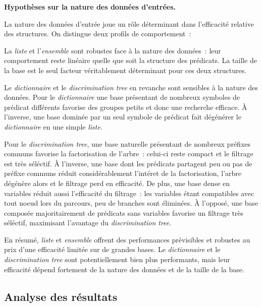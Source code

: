 \documentclass[11pt]{article}
\newenvironment{paraph}[1]{%
  \medskip
  \noindent\textbf{#1.}\quad

  \vspace{0.2cm}
}{%
  \medskip
}
\begin{document}
\begin{paraph}{Hypothèses sur la nature des données d'entrées}
    La nature des données d'entrée joue un rôle déterminant dans l'efficacité relative
    des structures. On distingue deux profils de comportement~:

    \vspace{0.2cm}
    La \textit{liste} et l'\textit{ensemble} sont robustes face à la nature des données~: 
    leur comportement reste linéaire quelle que soit la structure des prédicats. La taille de la base est le seul
    facteur véritablement déterminant pour ces deux structures.

    \vspace{0.2cm}
    Le \textit{dictionnaire} et le \textit{discrimination tree} en revanche sont sensibles à la nature
    des données. Pour le \textit{dictionnaire} une base présentant de nombreux symboles de prédicat
    différents favorise des groupes petits et donc une recherche efficace. À l'inverse, une base dominée
    par un seul symbole de prédicat fait dégénérer le \textit{dictionnaire} en une simple \textit{liste}.

    \vspace{0.2cm}
    Pour le \textit{discrimination tree}, une base naturelle présentant de nombreux préfixes communs
    favorise la factorisation de l'arbre~: celui-ci reste compact et le filtrage est très séléctif.
    À l'inverse, une base dont les prédicats partagent peu ou pas de préfixe communs réduit considérablement
    l'intéret de la factorisation, l'arbre dégénère alors et le filtrage perd en efficacité. De plus,
    une base dense en variables réduit aussi l'efficacité du filtrage~: les variables
    étant compatibles avec tout noeud lors du parcours, peu de branches sont éliminées.
    À l'opposé, une base composée majoritairement de prédicats sans variables favorise un filtrage très séléctif, 
    maximisant l'avantage du \textit{discrimination tree}.

   \vspace{0.2cm}
   En résumé, \textit{liste} et \textit{ensemble} offrent des performances prévisibles et robustes au prix
   d'une efficacité limitée sur de grandes bases. Le \textit{dictionnaire} et le \textit{discrimination tree} sont
   potentiellement bien plus performants, mais leur efficacité dépend fortement de la nature des données et de la taille
   de la base.
\end{paraph}

\subsection{Analyse des résultats}
\end{document}
